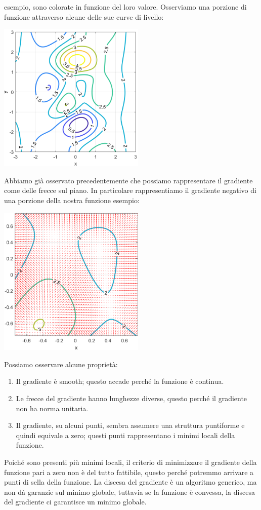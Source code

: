 \documentclass{article}
\begin{document}
        esempio, sono colorate in funzione del loro valore. Osserviamo una porzione di funzione attraverso alcune delle sue curve di livello:
        \begin{center}\includegraphics[width=7cm]{curve_livello.png}\end{center}
        Abbiamo già osservato precedentemente che possiamo rappresentare il gradiente come delle frecce sul piano. In particolare 
        rappresentiamo il gradiente negativo di una porzione della nostra funzione esempio:
        \begin{center}\includegraphics[width=7cm]{neg_grad.png}\end{center}
        Possiamo osservare alcune proprietà:
        \begin{enumerate}
            \item Il gradiente è smooth; questo accade perché la funzione è continua.
            \item Le frecce del gradiente hanno lunghezze diverse, questo perché il gradiente non ha norma unitaria.
            \item Il gradiente, su alcuni punti, sembra assumere una struttura puntiforme e quindi equivale a zero; questi 
            punti rappresentano i minimi locali della funzione.
        \end{enumerate}
        Poiché sono presenti più minimi locali, il criterio di minimizzare il gradiente della funzione pari a zero non è 
        del tutto fattibile, questo perché potremmo arrivare a punti di sella della funzione.
        La discesa del gradiente è un algoritmo generico, ma non dà garanzie sul minimo globale, tuttavia se la funzione è
        convessa, la discesa del gradiente ci garantisce un minimo globale.
\end{document}
